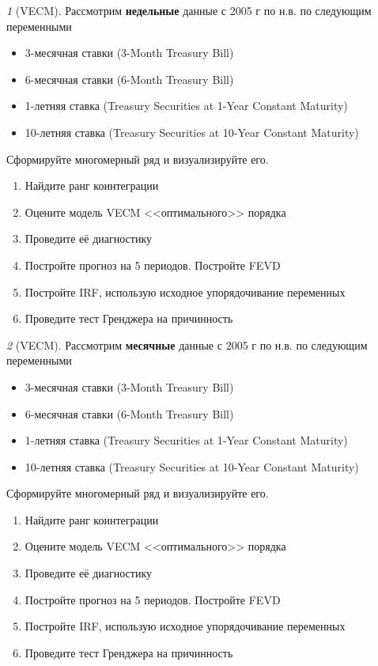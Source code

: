 \documentclass[12pt]{article}
\theoremstyle{remark}
\newtheorem{exercise}{}[subsection]
\begin{document}
\begin{exercise}[VECM]
Рассмотрим \textbf{недельные} данные с 2005 г по н.в. по следующим переменными
\begin{itemize}
	\item 3-месячная ставки (3-Month Treasury Bill)
	\item 6-месячная ставки (6-Month Treasury Bill)
	\item 1-летняя ставка (Treasury Securities at 1-Year Constant Maturity)
	\item 10-летняя ставка (Treasury Securities at 10-Year Constant Maturity)
\end{itemize}
Сформируйте многомерный ряд и визуализируйте его.
\begin{enumerate}
	\item Найдите ранг коинтеграции
	\item Оцените модель VECM <<оптимального>> порядка
	\item Проведите её диагностику
	\item Постройте прогноз на 5 периодов. Постройте FEVD
	\item Постройте IRF, использую исходное упорядочивание переменных
	\item Проведите тест Гренджера на причинность
\end{enumerate}
\end{exercise}

\begin{exercise}[VECM]
Рассмотрим \textbf{месячные} данные с 2005 г по н.в. по следующим переменными
\begin{itemize}
	\item 3-месячная ставки (3-Month Treasury Bill)
	\item 6-месячная ставки (6-Month Treasury Bill)
	\item 1-летняя ставка (Treasury Securities at 1-Year Constant Maturity)
	\item 10-летняя ставка (Treasury Securities at 10-Year Constant Maturity)
\end{itemize}
Сформируйте многомерный ряд и визуализируйте его.
\begin{enumerate}
	\item Найдите ранг коинтеграции
	\item Оцените модель VECM <<оптимального>> порядка
	\item Проведите её диагностику
	\item Постройте прогноз на 5 периодов. Постройте FEVD
	\item Постройте IRF, использую исходное упорядочивание переменных
	\item Проведите тест Гренджера на причинность
\end{enumerate}
\end{exercise}
\end{document}
